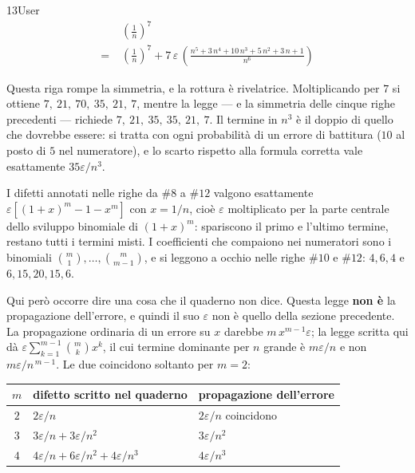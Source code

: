 \begin{espr}{13}{User}{}
\begin{align*}
& \left(\frac{1}{n}\right)^{7} \\
=\;& \left(\frac{1}{n}\right)^{7} + 7\, \varepsilon\, \left(\frac{n^{5} + 3\, n^{4} + 10\, n^{3} + 5\, n^{2} + 3\, n + 1}{n^{6}}\right)
\end{align*}
\end{espr}
Questa riga rompe la simmetria, e la rottura è rivelatrice. Moltiplicando per $7$ si ottiene $7,\ 21,\ 70,\ 35,\ 21,\ 7$, mentre la legge — e la simmetria delle cinque righe precedenti — richiede $7,\ 21,\ 35,\ 35,\ 21,\ 7$. Il termine in $n^3$ è il doppio di quello che dovrebbe essere: si tratta con ogni probabilità di un errore di battitura ($10$ al posto di $5$ nel numeratore), e lo scarto rispetto alla formula corretta vale esattamente $35\varepsilon/n^3$.


I difetti annotati nelle righe da $\#8$ a $\#12$ valgono esattamente $\varepsilon\left[(1+x)^m-1-x^m\right]$ con $x=1/n$, cioè $\varepsilon$ moltiplicato per la parte centrale dello sviluppo binomiale di $(1+x)^m$: spariscono il primo e l'ultimo termine, restano tutti i termini misti. I coefficienti che compaiono nei numeratori sono i binomiali $\binom{m}{1},\dots,\binom{m}{m-1}$, e si leggono a occhio nelle righe $\#10$ e $\#12$: $4,6,4$ e $6,15,20,15,6$.

Qui però occorre dire una cosa che il quaderno non dice. Questa legge \textbf{non è} la propagazione dell'errore, e quindi il suo $\varepsilon$ non è quello della sezione precedente. La propagazione ordinaria di un errore su $x$ darebbe $m\,x^{m-1}\varepsilon$; la legge scritta qui dà $\varepsilon\sum_{k=1}^{m-1}\binom{m}{k}x^{k}$, il cui termine dominante per $n$ grande è $m\varepsilon/n$ e non $m\varepsilon/n^{\,m-1}$. Le due coincidono soltanto per $m=2$:

\begin{center}\small
\begin{tabular}{@{}c l l@{}}
\toprule
$m$ & difetto scritto nel quaderno & propagazione dell'errore\\
\midrule
$2$ & $2\varepsilon/n$ & $2\varepsilon/n$ \quad coincidono\\
$3$ & $3\varepsilon/n+3\varepsilon/n^2$ & $3\varepsilon/n^2$\\
$4$ & $4\varepsilon/n+6\varepsilon/n^2+4\varepsilon/n^3$ & $4\varepsilon/n^3$\\
\bottomrule
\end{tabular}
\end{center}

